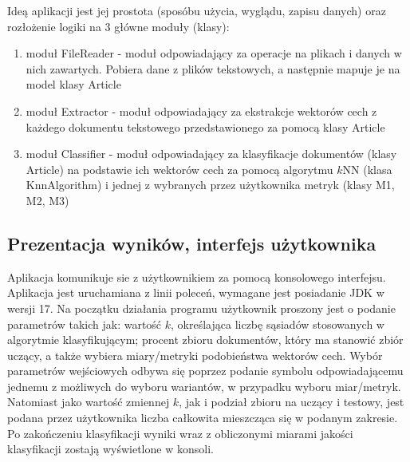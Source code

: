 \documentclass{classrep}
\begin{document}
Ideą aplikacji jest jej prostota (sposóbu użycia, wyglądu, zapisu danych) oraz rozłożenie logiki na 3 główne moduły (klasy): 
\begin{enumerate}
\item moduł FileReader - moduł odpowiadający za operacje na plikach i danych w nich zawartych. Pobiera dane z plików tekstowych, \cite{teksty} a następnie mapuje je na model klasy Article
\item moduł Extractor - moduł odpowiadający za ekstrakcje wektorów cech z każdego dokumentu tekstowego przedstawionego za pomocą klasy Article
\item moduł Classifier - moduł odpowiadający za klasyfikacje dokumentów (klasy Article) na podstawie ich wektorów cech za pomocą algorytmu \(k\)NN \cite{tadeusiewicz90} (klasa KnnAlgorithm) i jednej z wybranych przez użytkownika metryk (klasy M1, M2, M3)
\end{enumerate}

\subsection{Prezentacja wyników, interfejs użytkownika}  
Aplikacja komunikuje sie z użytkownikiem za pomocą konsolowego interfejsu. Aplikacja jest uruchamiana z linii poleceń, wymagane jest posiadanie JDK w wersji 17. Na początku działania programu użytkownik proszony jest o podanie parametrów takich jak:  
wartość $k$, określająca liczbę sąsiadów stosowanych w algorytmie klasyfikującym; 
procent zbioru dokumentów, który ma stanowić zbiór uczący, a także wybiera miary/metryki podobieństwa wektorów cech. Wybór parametrów wejściowych odbywa się poprzez podanie
symbolu odpowiadającemu jednemu z możliwych do wyboru wariantów, w przypadku wyboru miar/metryk. Natomiast jako wartość zmiennej $k$, jak i podział zbioru na uczący i testowy, jest podana przez użytkownika liczba całkowita mieszcząca się w podanym zakresie.
Po zakończeniu klasyfikacji wyniki wraz z obliczonymi miarami jakości klasyfikacji zostają wyświetlone w konsoli.



\end{document}

